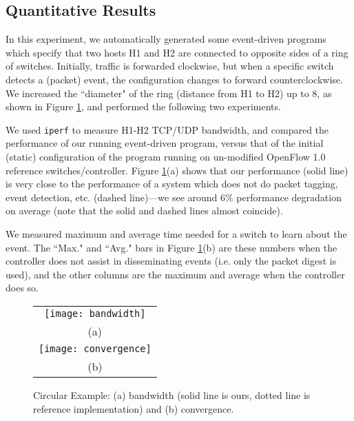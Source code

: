\documentclass[pldi-cameraready]{sigplanconf}
\begin{document}
\subsection{Quantitative Results}

In this experiment, we automatically generated some event-driven programs which specify
that two hosts H1 and H2 are connected to opposite sides of a ring of switches. Initially,
traffic is forwarded clockwise, but when a specific switch detects a (packet) event, the
configuration changes to forward counterclockwise.
We increased the ``diameter" of the ring (distance from H1 to H2) up to 8, as shown in
Figure \ref{fig:bandwidth}, and performed the following two experiments.
\begin{compactenum}
\item We used {\tt iperf} to measure H1-H2 TCP/UDP bandwidth, and compared the
performance of our running event-driven program, versus that of the initial (static)
configuration of the program running on un-modified OpenFlow 1.0 reference
switches/controller. Figure \ref{fig:bandwidth}(a) shows that our performance
(solid line) is very close to the performance of a system which does not do packet tagging, event
detection, etc. (dashed line)---we see around 6\% performance degradation on average (note
that the solid and dashed lines almost coincide).
\item We measured maximum and average time needed for a switch to learn about the event.
The ``Max." and ``Avg." bars in Figure \ref{fig:bandwidth}(b) are these numbers when the
controller does not assist in disseminating events (i.e. only the packet digest is used),
and the other columns are the maximum and average when the controller does so.
\end{compactenum}

\begin{figure}
\centering
\bgroup
\def\arraystretch{0.5}
\begin{tabular}{c}
\texttt{[image: bandwidth]} \\
{\scriptsize (a)} \\
\texttt{[image: convergence]} \\
{\scriptsize (b)}
\end{tabular}
\egroup
\caption{Circular Example: (a) bandwidth (solid line is ours, dotted line is reference implementation)
and (b) convergence.}
\label{fig:bandwidth}
\end{figure}
\end{document}
